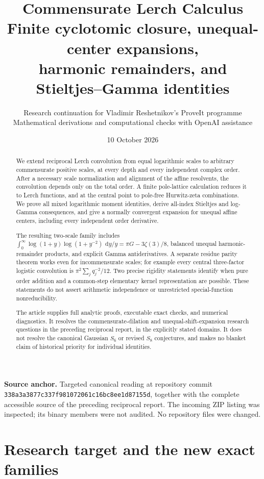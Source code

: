\documentclass[11pt,a4paper]{article}
\title{\textbf{Commensurate Lerch Calculus}\\[6pt]
\large Finite cyclotomic closure, unequal-center expansions,\\
harmonic remainders, and Stieltjes--Gamma identities}
\author{Research continuation for Vladimir Reshetnikov's ProveIt programme\\
\small Mathematical derivations and computational checks with OpenAI assistance}
\date{10 October 2026}
\numberwithin{equation}{section}
\theoremstyle{definition}\newtheorem{definition}[theorem]{Definition}
\theoremstyle{remark}\newtheorem{remark}[theorem]{Remark}
\newcommand{\dd}{\,\mathrm d}
\newcommand{\src}[1]{\nolinkurl{#1}}
\begin{document}
\maketitle
\begin{abstract}
We extend reciprocal Lerch convolution from equal logarithmic scales to
arbitrary commensurate positive scales, at every depth and every independent
complex order. After a necessary scale normalization and alignment of the
affine resolvents, the convolution depends only on the total order. A finite
pole-lattice calculation reduces it to Lerch functions, and at the central
point to pole-free Hurwitz-zeta combinations. We prove all mixed logarithmic
moment identities, derive all-index Stieltjes and log-Gamma consequences,
and give a normally convergent expansion for unequal affine centers,
including every independent order derivative.

The resulting two-scale family includes
$\int_0^\infty\log(1+y)\log(1+y^{-2})\,\dd y/y
=\pi G-3\zeta(3)/8$, balanced unequal harmonic-remainder products, and
explicit Gamma antiderivatives. A separate residue parity theorem works even
for incommensurate scales; for example every central three-factor logistic
convolution is $\pi^2\sum_jq_j^{-2}/12$. Two precise rigidity statements
identify when pure order addition and a common-step elementary kernel
representation are possible. These statements do not assert arithmetic
independence or unrestricted special-function nonreducibility.

The article supplies full analytic proofs, executable exact checks, and
numerical diagnostics. It resolves the commensurate-dilation and
unequal-shift-expansion research questions in the preceding reciprocal
report, in the explicitly stated domains. It does not resolve the canonical
Gaussian $S_6$ or revised $S_8$ conjectures, and makes no blanket claim of
historical priority for individual identities.
\end{abstract}
\vfill
\noindent\small\textbf{Source anchor.} Targeted canonical reading at repository commit\\
\src{338a3a3877c337f981072061c16bc8ee1d87155d}, together with the complete
accessible source of the preceding reciprocal report. The incoming ZIP
listing was inspected; its binary members were not audited. No repository
files were changed.\normalsize
\clearpage
\begingroup\small\tableofcontents\endgroup
\clearpage
\section{Research target and the new exact families}
\label{clc:sec:scope}
\end{document}
